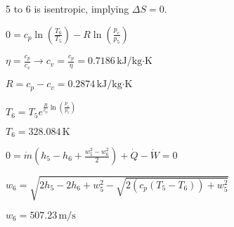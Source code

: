 5 to 6 is isentropic, implying \( \Delta S = 0 \).  

\( 0 = c_p \ln \left( \frac{T_6}{T_5} \right) - R \ln \left( \frac{p_c}{p_5} \right) \)  

\( \eta = \frac{c_p}{c_v} \rightarrow c_v = \frac{c_p}{\eta} = 0.7186 \, \text{kJ/kg·K} \)  

\( R = c_p - c_v = 0.2874 \, \text{kJ/kg·K} \)  

\( T_6 = T_5 e^{\frac{R}{c_p} \ln \left( \frac{p_c}{p_5} \right)} \)  

\( T_6 = 328.084 \, \text{K} \)  

\( 0 = \dot{m} \left( h_5 - h_6 + \frac{w_5^2 - w_6^2}{2} \right) + \dot{Q} - \dot{W} = 0 \)  

\( w_6 = \sqrt{2 h_5 - 2 h_6 + w_5^2 - \sqrt{2 \left( c_p \left( T_5 - T_6 \right) \right) + w_5^2}} \)  

\( w_6 = 507.23 \, \text{m/s} \)